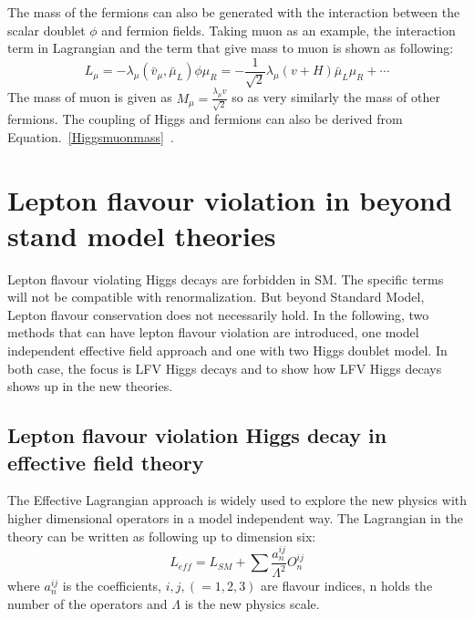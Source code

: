 The mass of the fermions can also be generated with the interaction between the scalar doublet $\phi$ and fermion fields. Taking muon as an example, the interaction term in Lagrangian and the term that give mass to muon is shown as following:
\begin{equation}\label{Higgsmuonmass}
L_{\mu}=-\lambda_{\mu}(\bar{v}_{\mu},\bar{\mu}_{L})\phi\mu_{R}
            =-\frac{1}{\sqrt{2}}\lambda_{\mu}(v+H)\bar{\mu}_{L}\mu_{R}+ \cdots
\end{equation}
The mass of muon is given as $M_{\mu}=\frac{\lambda_{\mu}v}{\sqrt{2}}$ so as very similarly the mass of other fermions. The coupling of Higgs and fermions can also be derived from Equation.~\ref{Higgsmuonmass}~\cite{DJOUADI20081}. 



\section{Lepton flavour violation in beyond stand model theories}
Lepton flavour violating Higgs decays are forbidden in SM. The specific terms will not be compatible with renormalization. But beyond Standard Model, Lepton flavour conservation does not necessarily hold. In the following, two methods that can have lepton flavour violation are introduced, one model independent effective field approach and one with two Higgs doublet model. In both case, the focus is LFV Higgs decays and to show how LFV Higgs decays shows up in the new theories. 


\subsection{Lepton flavour violation Higgs decay in effective field theory}
The Effective Lagrangian approach is widely used to explore the new physics with higher dimensional operators in a model independent way. The Lagrangian in the theory can be written as following up to dimension six: 
\begin{equation}
L_{eff}=L_{SM}+\sum\frac{a^{ij}_{n}}{\Lambda^{2}}O^{ij}_{n}
\end{equation}
where $a^{ij}_{n}$ is the coefficients, $i,j,(=1,2,3)$ are flavour indices, n holds the number of the operators and $\Lambda$ is the new physics scale. 

